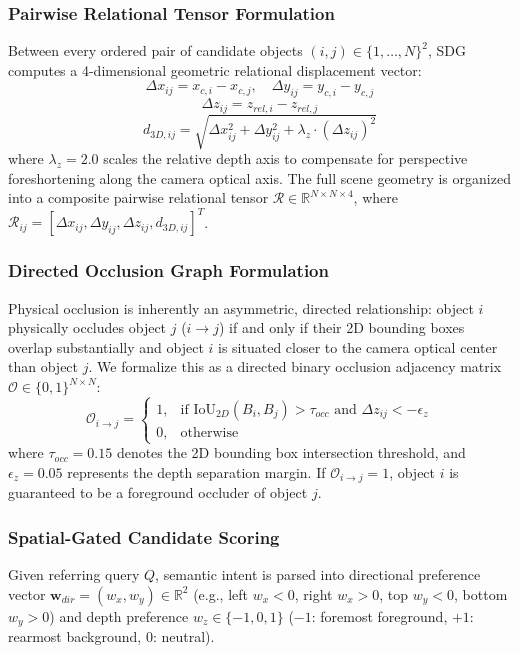 \documentclass[10pt,twocolumn,letterpaper]{article}
\begin{document}
\subsubsection{Pairwise Relational Tensor Formulation}
Between every ordered pair of candidate objects $(i, j) \in \{1, \dots, N\}^2$, SDG computes a 4-dimensional geometric relational displacement vector:
\begin{equation}
\Delta x_{ij} = x_{c,i} - x_{c,j}, \quad \Delta y_{ij} = y_{c,i} - y_{c,j}
\end{equation}
\begin{equation}
\Delta z_{ij} = z_{rel,i} - z_{rel,j}
\end{equation}
\begin{equation}
d_{3D,ij} = \sqrt{\Delta x_{ij}^2 + \Delta y_{ij}^2 + \lambda_z \cdot (\Delta z_{ij})^2}
\end{equation}
where $\lambda_z = 2.0$ scales the relative depth axis to compensate for perspective foreshortening along the camera optical axis. The full scene geometry is organized into a composite pairwise relational tensor $\mathcal{R} \in \mathbb{R}^{N \times N \times 4}$, where $\mathcal{R}_{ij} = [\Delta x_{ij}, \Delta y_{ij}, \Delta z_{ij}, d_{3D,ij}]^T$.

\subsubsection{Directed Occlusion Graph Formulation}
Physical occlusion is inherently an asymmetric, directed relationship: object $i$ physically occludes object $j$ ($i \to j$) if and only if their 2D bounding boxes overlap substantially and object $i$ is situated closer to the camera optical center than object $j$. We formalize this as a directed binary occlusion adjacency matrix $\mathcal{O} \in \{0, 1\}^{N \times N}$:
\begin{equation}
\mathcal{O}_{i \to j} = \begin{cases} 
1, & \text{if } \mathrm{IoU}_{2D}(B_i, B_j) > \tau_{occ} \text{ and } \Delta z_{ij} < -\epsilon_z \\ 
0, & \text{otherwise} 
\end{cases}
\label{eq:occlusion}
\end{equation}
where $\tau_{occ} = 0.15$ denotes the 2D bounding box intersection threshold, and $\epsilon_z = 0.05$ represents the depth separation margin. If $\mathcal{O}_{i \to j} = 1$, object $i$ is guaranteed to be a foreground occluder of object $j$.

\subsubsection{Spatial-Gated Candidate Scoring}
Given referring query $Q$, semantic intent is parsed into directional preference vector $\mathbf{w}_{dir} = (w_x, w_y) \in \mathbb{R}^2$ (e.g., left $w_x < 0$, right $w_x > 0$, top $w_y < 0$, bottom $w_y > 0$) and depth preference $w_z \in \{-1, 0, 1\}$ ($-1$: foremost foreground, $+1$: rearmost background, $0$: neutral). 
\end{document}
